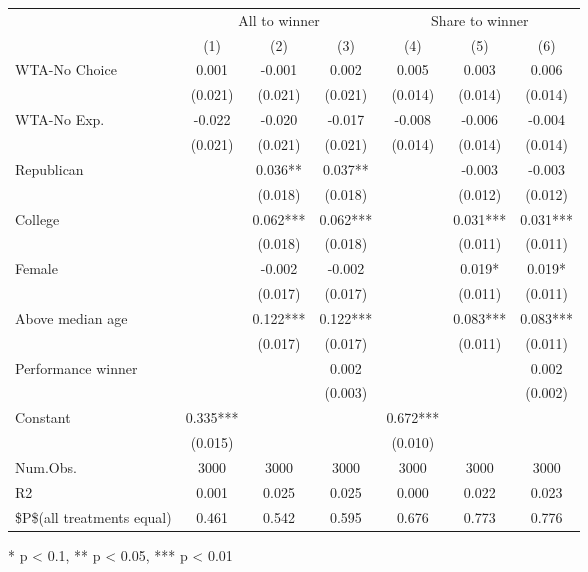 \begin{table}[t]
\fontsize{12.0pt}{14.4pt}\selectfont
\begin{tabular*}{\linewidth}{@{\extracolsep{\fill}}lcccccc}
\toprule
 & \multicolumn{3}{c}{All to winner} & \multicolumn{3}{c}{Share to winner} \\ 
\cmidrule(lr){2-4} \cmidrule(lr){5-7}
  & (1) & (2) & (3) & (4) & (5) & (6) \\ 
\midrule\addlinespace[2.5pt]
WTA-No Choice & 0.001 & -0.001 & 0.002 & 0.005 & 0.003 & 0.006 \\ 
 & (0.021) & (0.021) & (0.021) & (0.014) & (0.014) & (0.014) \\ 
WTA-No Exp. & -0.022 & -0.020 & -0.017 & -0.008 & -0.006 & -0.004 \\ 
 & (0.021) & (0.021) & (0.021) & (0.014) & (0.014) & (0.014) \\ 
Republican &  & 0.036** & 0.037** &  & -0.003 & -0.003 \\ 
 &  & (0.018) & (0.018) &  & (0.012) & (0.012) \\ 
College &  & 0.062*** & 0.062*** &  & 0.031*** & 0.031*** \\ 
 &  & (0.018) & (0.018) &  & (0.011) & (0.011) \\ 
Female &  & -0.002 & -0.002 &  & 0.019* & 0.019* \\ 
 &  & (0.017) & (0.017) &  & (0.011) & (0.011) \\ 
Above median age &  & 0.122*** & 0.122*** &  & 0.083*** & 0.083*** \\ 
 &  & (0.017) & (0.017) &  & (0.011) & (0.011) \\ 
Performance winner &  &  & 0.002 &  &  & 0.002 \\ 
 &  &  & (0.003) &  &  & (0.002) \\ 
Constant & 0.335*** &  &  & 0.672*** &  &  \\ 
{} & {(0.015)} & {} & {} & {(0.010)} & {} & {} \\ 
Num.Obs. & 3000 & 3000 & 3000 & 3000 & 3000 & 3000 \\ 
R2 & 0.001 & 0.025 & 0.025 & 0.000 & 0.022 & 0.023 \\ 
\$P\$(all treatments equal) & 0.461 & 0.542 & 0.595 & 0.676 & 0.773 & 0.776 \\ 
\bottomrule
\end{tabular*}
\begin{minipage}{\linewidth}
* p < 0.1, ** p < 0.05, *** p < 0.01\\
\end{minipage}
\end{table}

